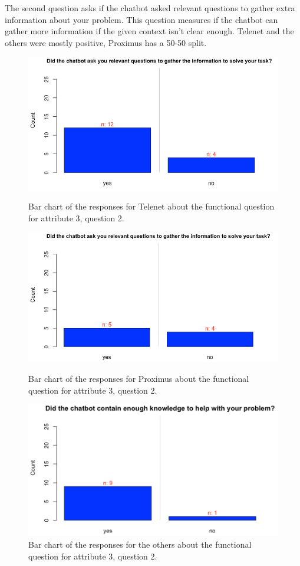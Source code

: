 \break
The second question asks if the chatbot asked relevant questions to gather extra information about your problem. This question measures if the chatbot can gather more information if the given context isn't clear enough. Telenet and the others were mostly positive, Proximus has a 50-50 split.\\
\begin{figure}[!htb]
	\includegraphics[width=\linewidth]{../LaTeX/Figures/Comparative/Q3Tb.png}
	\caption{Bar chart of the responses for Telenet about the functional question for attribute 3, question 2.}\label{fig:Q3Tb}
	\endminipage\hfill
	\includegraphics[width=\linewidth]{../LaTeX/Figures/Comparative/Q3Pb.png}
	\caption{Bar chart of the responses for Proximus about the functional question for attribute 3, question 2.}\label{fig:Q3Pb}
	\endminipage\hfill
	\includegraphics[width=\linewidth]{../LaTeX/Figures/Comparative/Q3O.png}
	\caption{Bar chart of the responses for the others about the functional question for attribute 3, question 2.}\label{fig:Q3Ob}
	\endminipage\hfill
\end{figure}

